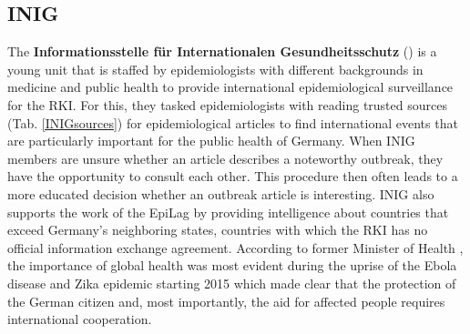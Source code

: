 \subsection{INIG}
  The \textbf{Informationsstelle für Internationalen Gesundheitsschutz} () is a young unit that is staffed by epidemiologists with different backgrounds in medicine and public health to provide international epidemiological surveillance for the RKI.
  For this, they tasked epidemiologists with reading trusted sources (Tab. \ref{INIGsources}) for epidemiological articles to find international events that are particularly important for the public health of Germany.
  When INIG members are unsure whether an article describes a noteworthy outbreak, they have the opportunity to consult each other.
  This procedure then often leads to a more educated decision whether an outbreak article is interesting.
  INIG also supports the work of the EpiLag by providing intelligence about countries that exceed Germany's neighboring states, countries with which the RKI has no official information exchange agreement.
  According to former Minister of Health \citeauthor{Grohe2017}, the importance of global health was most evident during the uprise of the Ebola disease and Zika epidemic starting 2015 which made clear that the protection of the German citizen and, most importantly, the aid for affected people requires international cooperation.


